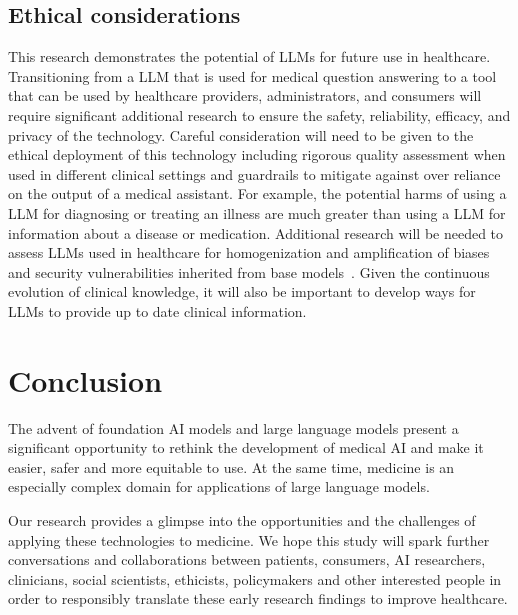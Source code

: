 \subsection{Ethical considerations}

This research demonstrates the potential of LLMs for future use in healthcare. Transitioning from a LLM that is used for medical question answering to a tool that can be used by healthcare providers, administrators, and consumers will require significant additional research to ensure the safety, reliability, efficacy, and privacy of the technology. Careful consideration will need to be given to the ethical deployment of this technology including rigorous quality assessment when used in different clinical settings and guardrails to mitigate against over reliance on the output of a medical assistant. For example, the potential harms of using a LLM for diagnosing or treating an illness are much greater than using a LLM for information about a disease or medication. Additional research will be needed to assess LLMs used in healthcare for homogenization and amplification of biases and security vulnerabilities inherited from base models~\cite{liang2022holistic,creel2022algorithmic,bommasani2021opportunities, kleinberg2021algorithmic, Bommasani2022Language}. Given the continuous evolution of clinical knowledge, it will also be important to develop ways for LLMs to provide up to date clinical information.

\section{Conclusion}
\label{sec:conclusion}

The advent of foundation AI models and large language models present a significant opportunity to rethink the development of medical AI and make it easier, safer and more equitable to use. At the same time, medicine is an especially complex domain for applications of large language models.

Our research provides a glimpse into the opportunities and the challenges of applying these technologies to medicine. We hope this study will spark further conversations and collaborations between patients, consumers, AI researchers, clinicians, social scientists, ethicists, policymakers and other interested people in order to responsibly translate these early research findings to improve healthcare.

